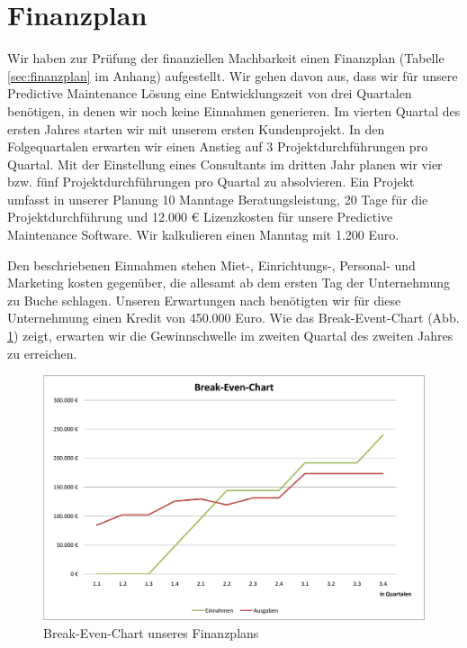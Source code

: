\section{Finanzplan}
Wir haben zur Prüfung der finanziellen Machbarkeit einen Finanzplan (Tabelle \ref{sec:finanzplan} im Anhang) aufgestellt. Wir gehen davon aus, dass wir für unsere Predictive Maintenance Lösung eine Entwicklungszeit von drei Quartalen benötigen, in denen wir noch keine Einnahmen generieren. Im vierten Quartal des ersten Jahres starten wir mit unserem ersten Kundenprojekt. In den Folgequartalen erwarten wir einen Anstieg auf 3 Projektdurchführungen pro Quartal. Mit der Einstellung eines Consultants im dritten Jahr planen wir vier bzw. fünf Projektdurchführungen pro Quartal zu absolvieren. Ein Projekt umfasst in unserer Planung 10 Manntage Beratungsleistung, 20 Tage für die Projektdurchführung und 12.000 € Lizenzkosten für unsere Predictive Maintenance Software. Wir kalkulieren einen Manntag mit 1.200 Euro.

Den beschriebenen Einnahmen stehen Miet-, Einrichtungs-, Personal- und Marketing kosten gegenüber, die allesamt ab dem ersten Tag der Unternehmung zu Buche schlagen. Unseren Erwartungen nach benötigten wir für diese Unternehmung einen Kredit von 450.000 Euro. Wie das Break-Event-Chart (Abb. \ref{fig:BreakEvenChart}) zeigt, erwarten wir die Gewinnschwelle im zweiten Quartal des zweiten Jahres zu erreichen. 

\vspace{2cm}
\begin{figure}[H]
\centering
\includegraphics[width=0.8\linewidth]{../Bilder/BreakEvenChart}
\caption{Break-Even-Chart unseres Finanzplans}
\label{fig:BreakEvenChart}
\end{figure}
